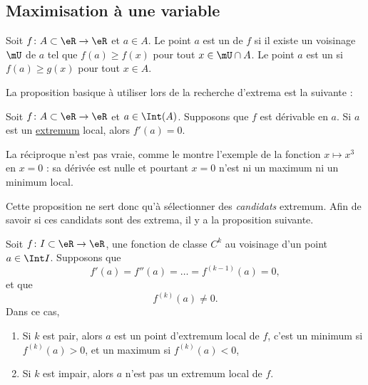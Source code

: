 					\subsection{Maximisation à une variable}

\begin{definition}
Soit $f\colon A\subset \eR\to \eR$ et $a\in A$. Le point $a$ est un  de $f$ si il existe un voisinage $\mU$ de $a$ tel que $f(a)\geq f(x)$ pour tout $x\in\mU\cap A$. Le point $a$ est un  si $f(a)\geq g(x)$ pour tout $x\in A$.
\end{definition}

La proposition basique à utiliser lors de la recherche d'extrema est la suivante :
\begin{proposition}
Soit $f\colon A\subset\eR\to \eR$ et $a\in\Int(A)$. Supposons que $f$ est dérivable en $a$. Si $a$ est un \href{http://fr.wikipedia.org/wiki/Extremum}{extremum} local, alors $f'(a)=0$.
\end{proposition}

La réciproque n'est pas vraie, comme le montre l'exemple de la fonction $x\mapsto x^3$ en $x=0$ : sa dérivée est nulle et pourtant $x=0$ n'est ni un maximum ni un minimum local. 

Cette proposition ne sert donc qu'à sélectionner des \emph{candidats} extremum. Afin de savoir si ces candidats sont des extrema, il y a la proposition suivante.
\begin{proposition}
Soit $f\colon I\subset \eR\to \eR$, une fonction de classe $C^k$ au voisinage d'un point $a\in\Int I$. Supposons que
\begin{equation}
	f'(a)=f''(a)=\ldots=f^{(k-1)}(a)=0,
\end{equation}
et que
\begin{equation}
	f^{(k)}(a)\neq 0.
\end{equation}
Dans ce cas,
\begin{enumerate}

\item
Si $k$ est pair, alors $a$ est un point d'extremum local de $f$, c'est un minimum si $f^{(k)}(a)>0$, et un maximum si $f^{(k)}(a)<0$,
\item
Si $k$ est impair, alors $a$ n'est pas un extremum local de $f$.

\end{enumerate}
\end{proposition}

